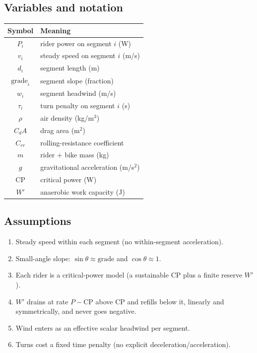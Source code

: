 \documentclass[11pt]{article}
\begin{document}
\subsection{Variables and notation}
\begin{center}
\begin{tabular}{cl}
\toprule
Symbol & Meaning \\
\midrule
$P_i$ & rider power on segment $i$ (W) \\
$v_i$ & steady speed on segment $i$ (m/s) \\
$d_i$ & segment length (m) \\
$\mathrm{grade}_i$ & segment slope (fraction) \\
$w_i$ & segment headwind (m/s) \\
$\tau_i$ & turn penalty on segment $i$ (s) \\
$\rho$ & air density (kg/m$^3$) \\
$C_dA$ & drag area (m$^2$) \\
$C_{rr}$ & rolling-resistance coefficient \\
$m$ & rider $+$ bike mass (kg) \\
$g$ & gravitational acceleration (m/s$^2$) \\
$\mathrm{CP}$ & critical power (W) \\
$W'$ & anaerobic work capacity (J) \\
\bottomrule
\end{tabular}
\end{center}

\subsection{Assumptions}
\begin{enumerate}
  \item Steady speed within each segment (no within-segment acceleration).
  \item Small-angle slope: $\sin\theta \approx \mathrm{grade}$ and $\cos\theta \approx 1$.
  \item Each rider is a critical-power model (a sustainable $\mathrm{CP}$ plus a finite reserve $W'$).
  \item $W'$ drains at rate $P-\mathrm{CP}$ above CP and refills below it, linearly and symmetrically, and never goes negative.
  \item Wind enters as an effective scalar headwind per segment.
  \item Turns cost a fixed time penalty (no explicit deceleration/acceleration).
\end{enumerate}
\end{document}
